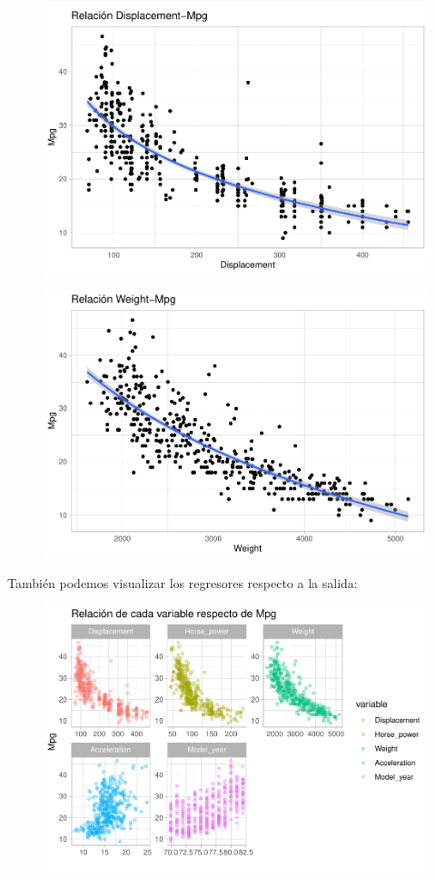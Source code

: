 \begin{figure}[H]\includegraphics[width=.9\linewidth]{img/EDA_files/figure-latex/unnamed-chunk-22-1} \caption{}\end{figure}
\begin{figure}[H]\includegraphics[width=.9\linewidth]{img/EDA_files/figure-latex/unnamed-chunk-22-2} \caption{}\end{figure}

También podemos visualizar los regresores respecto a la salida:

\begin{figure}[H]\includegraphics[width=.9\linewidth]{img/EDA_files/figure-latex/unnamed-chunk-23-1} \caption{}\end{figure}

